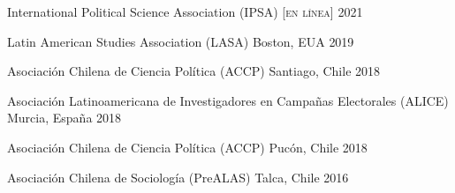 





\vspace{1mm}

\begin{cvhonors}
\cvconf
{International Political Science Association (IPSA)} 
{\scshape [en línea]}
{2021}
\end{cvhonors}

\begin{cvhonors}
\cvconf
{Latin American Studies Association (LASA)} 
{Boston, EUA}
{2019}
\end{cvhonors}

\begin{cvhonors}
\cvconf
{Asociación Chilena de Ciencia Política (ACCP)} 
{Santiago, Chile}
{2018}
\end{cvhonors}

\begin{cvhonors}
\cvconf
{Asociación Latinoamericana de Investigadores en Campañas Electorales (ALICE)} 
{Murcia, España}
{2018}
\end{cvhonors}

\begin{cvhonors}
\cvconf
{Asociación Chilena de Ciencia Política (ACCP)} 
{Pucón, Chile}
{2018}
\end{cvhonors}


\begin{cvhonors}
\cvconf
{Asociación Chilena de Sociología (PreALAS)} 
{Talca, Chile}
{2016}
\end{cvhonors}

